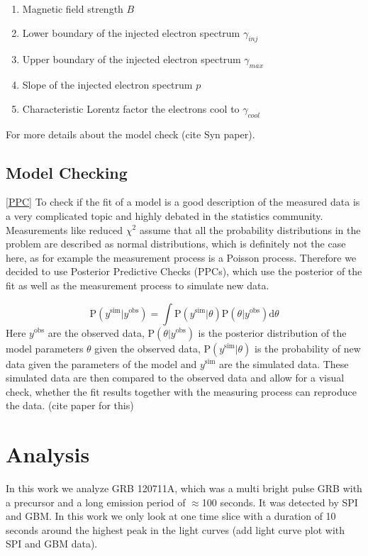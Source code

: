 \documentclass[twocolumn]{aa}
\begin{document}
\begin{enumerate}
	\item Magnetic field strength $B$
  \item Lower boundary of the injected electron spectrum $\gamma_{inj}$
  \item Upper boundary of the injected electron spectrum $\gamma_{max}$
  \item Slope of the injected electron spectrum $p$
  \item Characteristic Lorentz factor the electrons cool to $\gamma_{cool}$
\end{enumerate}

For more details about the model check (cite Syn paper).

\subsection{Model Checking}
\ref{PPC}
To check if the fit of a model is a good description of the measured data is a very complicated topic and highly debated in the statistics community. Measurements like reduced $\chi^{2}$ assume that all the probability distributions in the problem are described as normal distributions, which is definitely not the case here, as for example the measurement process is a Poisson process. Therefore we decided to use Posterior Predictive Checks (PPCs), which use the posterior of the fit as well as the measurement process to simulate new data.

\begin{equation}
  \textrm{P}(y^{\textrm{sim}}|y^{\textrm{obs}}) = \int \textrm{P}(y^{\textrm{sim}}|\theta) \textrm{P}(\theta|y^{\textrm{obs}}) \mathrm{d}\theta
\end{equation}
\noindent
Here $y^{\textrm{obs}}$ are the observed data, $\textrm{P}(\theta|y^{\textrm{obs}})$ is the posterior distribution of the model parameters $\theta$ given the observed data, $\textrm{P}(y^{\textrm{sim}}|\theta)$ is the probability of new data given the parameters of the model and $y^{\textrm{sim}}$ are the simulated data. These simulated data are then compared to the observed data and allow for a visual check, whether the fit results together with the measuring process can reproduce the data. (cite paper for this)
\section{Analysis}

In this work we analyze GRB 120711A, which was a multi bright pulse GRB with a precursor and a long emission period of $\approx$100 seconds. It was detected by SPI and GBM. In this work we only look at one time slice with a duration of 10 seconds around the highest peak in the light curves (add light curve plot with SPI and GBM data).
\end{document}
